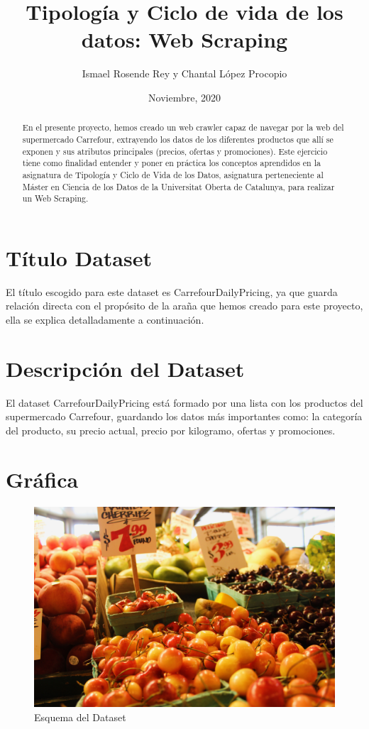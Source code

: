 \documentclass{article}
\title{Tipología y Ciclo de vida de los datos: Web Scraping}
\author{Ismael Rosende Rey y Chantal López Procopio}
\date{Noviembre, 2020}
\begin{document}
\maketitle

\begin{abstract}
    En  el  presente  proyecto,  hemos creado un  web  crawler  capaz  de  navegar  por  la  web  del supermercado Carrefour, extrayendo los  datos  de los diferentes  productos que allí se exponen y sus atributos principales (precios,  ofertas  y promociones). Este ejercicio tiene como finalidad entender y poner en práctica los conceptos aprendidos  en la  asignatura  de Tipología  y  Ciclo  de  Vida  de  los  Datos, asignatura perteneciente al Máster en Ciencia de los Datos de la Universitat Oberta de Catalunya, para  realizar  un Web Scraping.
\end{abstract}

\section{Título Dataset}
El título escogido para este dataset es CarrefourDailyPricing, ya que guarda relación directa con el propósito de la araña que hemos creado para este proyecto, ella se explica detalladamente a continuación.

\section{Descripción del Dataset}
El dataset CarrefourDailyPricing está formado por una lista con los productos del supermercado Carrefour, guardando los datos más importantes como: la categoría del producto, su precio actual, precio por kilogramo, ofertas y promociones.

\section{Gráfica}

\begin{figure}[H]
    \centering
    \includegraphics[width=0.4\linewidth]{super.jpg}
    \caption{Esquema del Dataset}
    \label{fig:dubs}
\end{figure}
\end{document}

